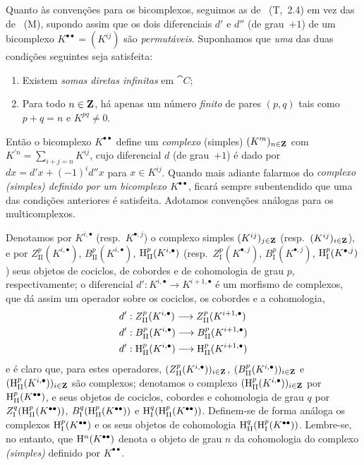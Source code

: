 \begin{env}[11.3.1]
\label{0.11.3.1}
Quanto às convenções para os bicomplexos, seguimos as de ~(T,~2.4) em vez das de ~(M), supondo assim que os dois diferenciais $d'$ e $d''$ (de grau~$+1$) de um bicomplexo $K^{\bullet\bullet}=(K^{ij})$ são \emph{permutáveis}.
Suponhamos que \emph{uma} das duas condições seguintes seja satisfeita:
\begin{enumerate}
   \item Existem \emph{somas diretas infinitas} em $\cat{C}$;
   \item Para todo $n\in\mathbf{Z}$, há apenas um número \emph{finito} de pares $(p,q)$ tais como $p+q=n$ e $K^{pq}\neq 0$.
 \end{enumerate}
Então o bicomplexo $K^{\bullet\bullet}$ define um \emph{complexo} (simples) $(K^{\prime n})_{n\in\mathbf{Z}}$ com $K^{\prime n}=\sum_{i+j=n}K^{ij}$, cujo diferencial $d$ (de grau~$+1$) é dado por $dx=d'x+(-1)^i d''x$ para $x\in K^{ij}$.
Quando mais adiante falarmos do \emph{complexo (simples) definido por um bicomplexo $K^{\bullet\bullet}$}, ficará sempre subentendido que uma das condições anteriores é satisfeita.
Adotamos convenções análogas para os multicomplexos.

Denotamos por $K^{i,\bullet}$ (resp.~$K^{\bullet,j}$) o complexo simples $(K^{ij})_{j\in\mathbf{Z}}$ (resp.~$(K^{ij})_{i\in\mathbf{Z}}$), e por $Z_\mathrm{II}^p(K^{i,\bullet})$, $B_\mathrm{II}^p(K^{i,\bullet})$, $\mathrm{H}_\mathrm{II}^p(K^{i,\bullet})$ (resp.~$Z_\mathrm{I}^p(K^{\bullet,j})$, $B_\mathrm{I}^p(K^{\bullet,j})$, $\mathrm{H}_\mathrm{I}^p(K^{\bullet,j})$) seus objetos de cociclos, de cobordes e de cohomologia de grau $p$, respectivamente;
o diferencial $d':K^{i,\bullet}\to K^{i+1,\bullet}$ é um morfismo de complexos, que dá assim um operador sobre os cociclos, os cobordes e a cohomologia,
\begin{align*}
  d'&:Z_\mathrm{II}^p(K^{i,\bullet})\to Z_\mathrm{II}^p(K^{i+1,\bullet})
\\d'&:B_\mathrm{II}^p(K^{i,\bullet})\to B_\mathrm{II}^p(K^{i+1,\bullet})
\\d'&:\HH_\mathrm{II}^p(K^{i,\bullet})\to\HH_\mathrm{II}^p(K^{i+1,\bullet})
\end{align*}
e é claro que, para estes operadores, $(Z_\mathrm{II}^p(K^{i,\bullet}))_{i\in\mathbf{Z}}$, $(B_\mathrm{II}^p(K^{i,\bullet}))_{i\in\mathbf{Z}}$ e $(\mathrm{H}_\mathrm{II}^p(K^{i,\bullet}))_{i\in\mathbf{Z}}$ são complexos;
denotamos o complexo $(\mathrm{H}_\mathrm{II}^p(K^{i,\bullet}))_{i\in\mathbf{Z}}$ por $\mathrm{H}_\mathrm{II}^p(K^{\bullet\bullet})$, e seus objetos de cociclos, cobordes e cohomologia de grau $q$ por $Z_\mathrm{I}^q(\mathrm{H}_\mathrm{II}^p(K^{\bullet\bullet}))$, $B_\mathrm{I}^q(\mathrm{H}_\mathrm{II}^p(K^{\bullet\bullet}))$ e $\mathrm{H}_\mathrm{I}^q(\mathrm{H}_\mathrm{II}^p(K^{\bullet\bullet}))$.
Definem-se de forma análoga os complexos $\mathrm{H}_\mathrm{I}^p(K^{\bullet\bullet})$ e os seus objetos de cohomologia $\mathrm{H}_\mathrm{II}^q(\mathrm{H}_\mathrm{I}^p(K^{\bullet\bullet}))$.
Lembre-se, no entanto, que $\mathrm{H}^n(K^{\bullet\bullet})$ denota o objeto de grau $n$ da cohomologia do complexo \emph{(simples)} definido por $K^{\bullet\bullet}$.
\end{env}

